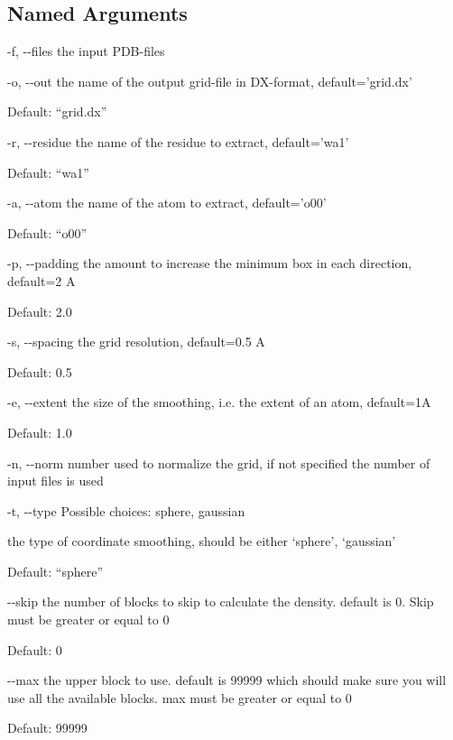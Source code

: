 \documentclass[letterpaper,10pt,english]{sphinxmanual}
\begin{document}
\subsection{Named Arguments}
\label{\detokenize{tools:Named Arguments}}\begin{optionlist}{3cm}
\item [-f, -{-}files]  
the input PDB-files
\item [-o, -{-}out]  
the name of the output grid-file in DX-format, default=’grid.dx’

Default: “grid.dx”
\item [-r, -{-}residue]  
the name of the residue to extract, default=’wa1’

Default: “wa1”
\item [-a, -{-}atom]  
the name of the atom to extract, default=’o00’

Default: “o00”
\item [-p, -{-}padding]  
the amount to increase the minimum box in each direction, default=2 A

Default: 2.0
\item [-s, -{-}spacing]  
the grid resolution, default=0.5 A

Default: 0.5
\item [-e, -{-}extent]  
the size of the smoothing, i.e. the extent of an atom, default=1A

Default: 1.0
\item [-n, -{-}norm]  
number used to normalize the grid, if not specified the number of input files is used
\item [-t, -{-}type]  
Possible choices: sphere, gaussian

the type  of coordinate smoothing, should be either ‘sphere’, ‘gaussian’

Default: “sphere”
\item [-{-}skip]  
the number of blocks to skip to calculate the density. default is 0. Skip must be greater or equal to 0

Default: 0
\item [-{-}max]  
the upper block to use. default is 99999 which should make sure you will use all the available blocks. max must be greater or equal to 0

Default: 99999
\end{optionlist}

\end{document}
